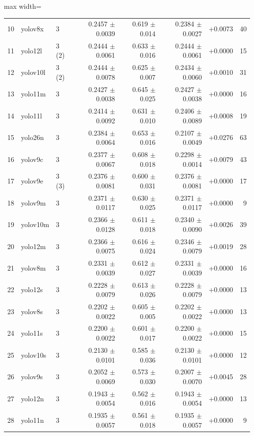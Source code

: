 \documentclass[10pt]{article}
\begin{document}
\begin{table}[htbp]
\begin{adjustbox}{max width=\linewidth}
\begin{tabular}{rllrrrrr}
10 & yolov8x & 3 & 0.2457 $\pm$ 0.0039 & 0.619 $\pm$ 0.014 & 0.2384 $\pm$ 0.0027 & +0.0073 & 40 \\
11 & yolo12l & 3 (2\textdagger{}) & 0.2444 $\pm$ 0.0061 & 0.633 $\pm$ 0.016 & 0.2444 $\pm$ 0.0061 & +0.0000 & 15 \\
12 & yolov10l & 3 (2\textdagger{}) & 0.2444 $\pm$ 0.0078 & 0.625 $\pm$ 0.007 & 0.2434 $\pm$ 0.0060 & +0.0010 & 31 \\
13 & yolo11m & 3 & 0.2427 $\pm$ 0.0038 & 0.645 $\pm$ 0.025 & 0.2427 $\pm$ 0.0038 & +0.0000 & 16 \\
14 & yolo11l & 3 & 0.2414 $\pm$ 0.0092 & 0.631 $\pm$ 0.010 & 0.2406 $\pm$ 0.0089 & +0.0008 & 19 \\
15 & yolo26n & 3 & 0.2384 $\pm$ 0.0064 & 0.653 $\pm$ 0.016 & 0.2107 $\pm$ 0.0049 & +0.0276 & 63 \\
16 & yolov9c & 3 & 0.2377 $\pm$ 0.0067 & 0.608 $\pm$ 0.018 & 0.2298 $\pm$ 0.0014 & +0.0079 & 43 \\
17 & yolov9e & 3 (3\textdagger{}) & 0.2376 $\pm$ 0.0081 & 0.600 $\pm$ 0.031 & 0.2376 $\pm$ 0.0081 & +0.0000 & 17 \\
18 & yolov9m & 3 & 0.2371 $\pm$ 0.0117 & 0.630 $\pm$ 0.025 & 0.2371 $\pm$ 0.0117 & +0.0000 & 9 \\
19 & yolov10m & 3 & 0.2366 $\pm$ 0.0128 & 0.611 $\pm$ 0.018 & 0.2340 $\pm$ 0.0090 & +0.0026 & 39 \\
20 & yolo12m & 3 & 0.2366 $\pm$ 0.0075 & 0.616 $\pm$ 0.024 & 0.2346 $\pm$ 0.0079 & +0.0019 & 28 \\
21 & yolov8m & 3 & 0.2331 $\pm$ 0.0039 & 0.612 $\pm$ 0.027 & 0.2331 $\pm$ 0.0039 & +0.0000 & 16 \\
22 & yolo12s & 3 & 0.2228 $\pm$ 0.0079 & 0.613 $\pm$ 0.026 & 0.2228 $\pm$ 0.0079 & +0.0000 & 13 \\
23 & yolov8s & 3 & 0.2202 $\pm$ 0.0022 & 0.605 $\pm$ 0.005 & 0.2202 $\pm$ 0.0022 & +0.0000 & 13 \\
24 & yolo11s & 3 & 0.2200 $\pm$ 0.0022 & 0.601 $\pm$ 0.017 & 0.2200 $\pm$ 0.0022 & +0.0000 & 15 \\
25 & yolov10s & 3 & 0.2130 $\pm$ 0.0101 & 0.585 $\pm$ 0.036 & 0.2130 $\pm$ 0.0101 & +0.0000 & 12 \\
26 & yolov9s & 3 & 0.2052 $\pm$ 0.0069 & 0.573 $\pm$ 0.030 & 0.2007 $\pm$ 0.0070 & +0.0045 & 28 \\
27 & yolo12n & 3 & 0.1943 $\pm$ 0.0054 & 0.562 $\pm$ 0.016 & 0.1943 $\pm$ 0.0054 & +0.0000 & 13 \\
28 & yolo11n & 3 & 0.1935 $\pm$ 0.0057 & 0.561 $\pm$ 0.018 & 0.1935 $\pm$ 0.0057 & +0.0000 & 9 \\

\end{tabular}
\end{adjustbox}
\end{table}
\end{document}

